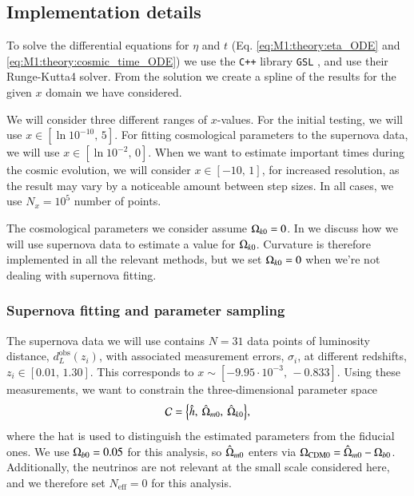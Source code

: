 
\subsection{Implementation details}\label{ssec:M1:implementations} 
To solve the differential equations for $\eta$ and $t$ (Eq. \eqref{eq:M1:theory:eta_ODE} and \eqref{eq:M1:theory:cosmic_time_ODE}) we use the \texttt{C++} library \texttt{GSL} \cite{gough2009gnu}, and use their Runge-Kutta4 solver. From the solution we create a spline of the results for the given $x$ domain we have considered. 

We will consider three different ranges of $x$-values. For the initial testing, we will use $x\in[\ln 10^{-10},\,5]$. For fitting cosmological parameters to the supernova data, we will use $x\in[\ln 10^{-2},\,0]$. When we want to estimate important times during the cosmic evolution, we will consider $x\in[-10,\,1]$, for increased resolution, as the result may vary by a noticeable amount between step sizes. In all cases, we use $N_x=10^5$ number of points.  

The cosmological parameters we consider assume $\Omega_{k0}=0$. In  we discuss how we will use supernova data to estimate a value for $\Omega_{k0}$. Curvature is therefore implemented in all the relevant methods, but we set $\Omega_{k0}=0$ when we're not dealing with supernova fitting.  

\subsubsection{Supernova fitting and parameter sampling}\label{sssec:M1:implementations:supernova_fitting}
The supernova data we will use contains $N=31$ data points of luminosity distance, $d_L^\mathrm{obs}(z_i)$, with associated measurement errors, $\sigma_i$, at different redshifts, $z_i\in[0.01,\,1.30]$. This corresponds to $x\sim[-9.95\cdot 10^{-3},\,-0.833]$. Using these measurements, we want to constrain the three-dimensional parameter space 
\begin{equation}
    \mathcal{C} = \Big\{ \hat{h},\: \hat{\Omega}_{m0},\: \hat{\Omega}_{k0} \Big\}, \label{eq:M1:implementations:supernova_parameter_space}
\end{equation}  
where the hat is used to distinguish the estimated parameters from the fiducial ones. We use $\Omega_{b0}=0.05$ for this analysis, so $\hat{\Omega}_{m0}$ enters via $\Omega_\mathrm{CDM0}=\hat{\Omega}_{m0}-\Omega_{b0}$. Additionally, the neutrinos are not relevant at the small scale considered here, and we therefore set $N_\mathrm{eff}=0$ for this analysis.  

